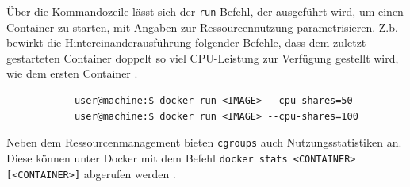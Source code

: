 \documentclass[../main.tex]{subfiles}
\begin{document}
		Über die Kommandozeile lässt sich der \texttt{run}-Befehl, der ausgeführt wird, um einen Container zu starten, mit Angaben zur Ressourcennutzung parametrisieren. Z.b. bewirkt die Hintereinanderausführung folgender Befehle, dass dem zuletzt gestarteten Container doppelt so viel CPU-Leistung zur Verfügung gestellt wird, wie dem ersten Container \cite{dockerRun}.

		\begin{lstlisting}
			user@machine:$ docker run <IMAGE> --cpu-shares=50
			user@machine:$ docker run <IMAGE> --cpu-shares=100
		\end{lstlisting}

		Neben dem Ressourcenmanagement bieten \texttt{\acrshort{cgroups}} auch Nutzungsstatistiken an. Diese können unter Docker mit dem Befehl \texttt{docker stats <CONTAINER> [<CONTAINER>]} abgerufen werden \cite{dockerMetrics}.









\end{document}

